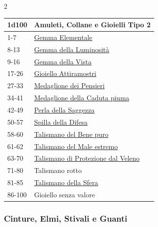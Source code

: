 \begin{multicols}{2}
{{\small\begin{tabularx}{\linewidth}{lX}
		\toprule
\rowcolor{gray!20}\textbf{1d100} & \textbf{Amuleti, Collane e Gioielli Tipo 2}\\
\toprule
1-7 & \hyperlink{Gemma Elementale}{Gemma Elementale}\\
\rowcolor{gray!20}8-13& \hyperlink{Gemma della Luminosità}{Gemma della Luminosità}\\
9-16& \hyperlink{Gemma della Vista}{Gemma della Vista}\\
\rowcolor{gray!20}17-26& \hyperlink{Gioiello Attiramostri}{Gioiello Attiramostri}\\
27-33& \hyperlink{Medaglione dei Pensieri}{Medaglione dei Pensieri}\\
\rowcolor{gray!20}34-41& \hyperlink{Medaglione della Caduta piuma}{Medaglione della Caduta piuma}\\
42-49& \hyperlink{Perla della Saggezza}{Perla della Saggezza}\\
\rowcolor{gray!20}50-57& \hyperlink{Spilla della Difesa}{Spilla della Difesa}\\
58-60& \hyperlink{Talismano del Bene puro}{Talismano del Bene puro}\\
\rowcolor{gray!20}61-62& \hyperlink{Talismano del Male estremo}{Talismano del Male estremo}\\
63-70& \hyperlink{Talismano della Protezione dal Veleno}{Talismano di Protezione dal Veleno}\\
\rowcolor{gray!20}71-80 & Talismano rotto\\
81-85& \hyperlink{Talismano della Sfera}{Talismano della Sfera}\\
\rowcolor{gray!20}86-100& Gioiello senza valore
\end{tabularx}}

\subsubsection{Cinture, Elmi, Stivali e Guanti}\hypertarget{cintureelmi}{}\label{cintureelmi}

}
\end{multicols}
